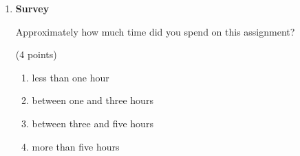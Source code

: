 \documentclass{article}
\newcounter{points}
\newcommand\setpoints[1]{\addtocounter{points}{#1}(#1 points)}
\newcommand\setpoint{\addtocounter{points}{1}(1 point)}
\begin{document}
\begin{enumerate}
\begin{enumerate}
\setcounter{enumii}{1}
\item \setpoint \\
Implement the factorial function.  Do not worry about using exact Python syntax--pseudocode is fine.
\end{enumerate}

\begin{enumerate}
\setcounter{enumii}{2}
\item \setpoint \\
The number of ways to pick a subset of $k$ items from a set of $n$ items, where order of selection does not matter, is denoted ${n \choose k}$ (often pronounced ``n choose k").  There is a simple formula for the function:
\[
{n \choose k} = \frac{n!}{k!(n - k)!}
\]

Write the function declaration for a function that computes ${n \choose k}$ with function name \texttt{nchoosek} and function arguments \texttt{n} and \texttt{k}.
\end{enumerate}

\begin{enumerate}
\setcounter{enumii}{3}
\item \setpoint \\
Implement the \texttt{nchoosek} function from part (c) by calling your factorial function from part (b).  Again, do not worry about using exact Python syntax--pseudocode is fine.
\end{enumerate}



\item \textbf{Survey}

Approximately how much time did you spend on this assignment? \setpoints{4}
\begin{enumerate}
\item less than one hour
\end{enumerate}

\begin{enumerate}
\setcounter{enumii}{1}
\item between one and three hours
\end{enumerate}

\begin{enumerate}
\setcounter{enumii}{2}
\item between three and five hours
\end{enumerate}

\begin{enumerate}
\setcounter{enumii}{3}
\item more than five hours
\end{enumerate}

\end{enumerate}
\end{document}

